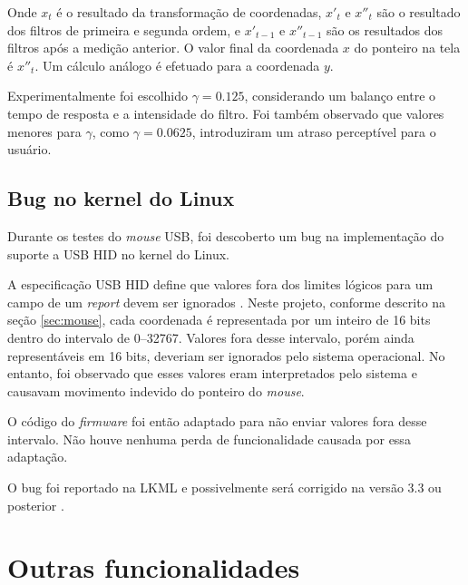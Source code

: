 \documentclass[brazil,pagestart=firstchapter]{abnt}
\begin{document}
Onde $x_t$ é o resultado da transformação de coordenadas, $x'_t$ e $x''_t$
são o resultado dos filtros de primeira e segunda ordem, e $x'_{t-1}$ e
$x''_{t-1}$ são os resultados dos filtros após a medição anterior. O valor
final da coordenada $x$ do ponteiro na tela é $x''_t$. Um cálculo análogo é
efetuado para a coordenada $y$.




Experimentalmente foi escolhido $\gamma = 0.125$, considerando um balanço
entre o tempo de resposta e a intensidade do filtro. Foi também observado
que valores menores para $\gamma$, como $\gamma = 0.0625$, introduziram um
atraso perceptível para o usuário.


\subsection{Bug no kernel do Linux}
\label{sub:linux_hid_bug}

Durante os testes do \textit{mouse} \ac{USB}, foi descoberto um bug na
implementação do suporte a \ac{USB} \ac{HID} no kernel do Linux.

A especificação \ac{USB} \ac{HID} define que valores fora dos limites
lógicos para um campo de um \textit{report} devem ser ignorados
\cite{usbhid}. Neste projeto, conforme descrito na seção
\ref{sec:mouse}, cada coordenada é representada por um inteiro de 16 bits
dentro do intervalo de \numrange{0}{32767}. Valores fora desse intervalo,
porém ainda representáveis em 16 bits, deveriam ser ignorados pelo sistema
operacional. No entanto, foi observado que esses valores eram interpretados
pelo sistema e causavam movimento indevido do ponteiro do \textit{mouse}.

O código do \textit{firmware} foi então adaptado para não enviar valores
fora desse intervalo. Não houve nenhuma perda de funcionalidade causada por
essa adaptação.

O bug foi reportado na \ac{LKML} \cite{LKMLhidnullvalues} e possivelmente
será corrigido na versão 3.3 ou posterior \cite{LKMLhidnullvaluesResposta}.


\section{Outras funcionalidades}
\label{sec:outras_funcionalidades}
\end{document}
